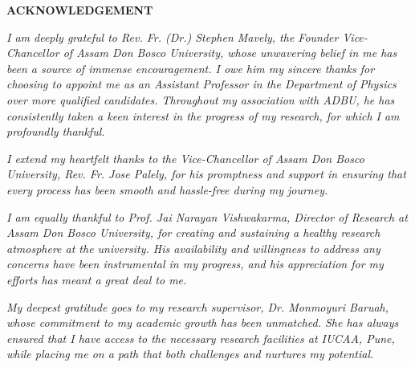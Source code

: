 \pagestyle{empty}
\begin{titlepage}
    \begin{center}
        {\bf\large{ACKNOWLEDGEMENT}}
    \end{center}
    \def\baselinestretch{1.0}
    
    
    \par\textsl{I am deeply grateful to Rev. Fr. (Dr.) Stephen Mavely, the Founder Vice-Chancellor of Assam Don Bosco University, whose unwavering belief in me has been a source of immense encouragement. I owe him my sincere thanks for choosing to appoint me as an Assistant Professor in the Department of Physics over more qualified candidates. Throughout my association with ADBU, he has consistently taken a keen interest in the progress of my research, for which I am profoundly thankful.}
    
    \par\textsl{I extend my heartfelt thanks to the Vice-Chancellor of Assam Don Bosco University, Rev. Fr. Jose Palely, for his promptness and support in ensuring that every process has been smooth and hassle-free during my journey.}
    
    \par\textsl{I am equally thankful to Prof. Jai Narayan Vishwakarma, Director of Research at Assam Don Bosco University, for creating and sustaining a healthy research atmosphere at the university. His availability and willingness to address any concerns have been instrumental in my progress, and his appreciation for my efforts has meant a great deal to me.}
    
    \par\textsl{My deepest gratitude goes to my research supervisor, Dr. Monmoyuri Baruah, whose commitment to my academic growth has been unmatched. She has always ensured that I have access to the necessary research facilities at IUCAA, Pune, while placing me on a path that both challenges and nurtures my potential.}
    

\end{titlepage}
